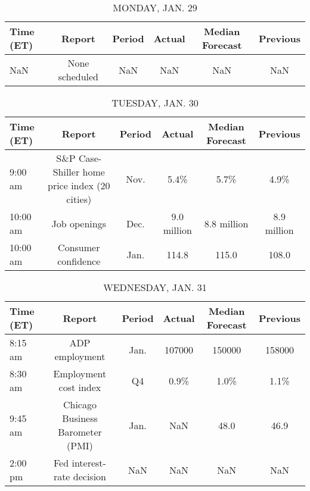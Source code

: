 \documentclass{article}%
\begin{document}
%
\normalsize%


\begin{table}[htbp]%
\caption{MONDAY, JAN. 29}%
\centering%
\begin{adjustbox}{width=1\textwidth}%
\begin{tabular}{lccccc}
\toprule
Time (ET) &         Report & Period & Actual & Median Forecast & Previous \\
\midrule
      NaN & None scheduled &    NaN &    NaN &             NaN &      NaN \\
\bottomrule
\end{tabular}
%
\end{adjustbox}%
\end{table}

%


\begin{table}[htbp]%
\caption{TUESDAY, JAN. 30}%
\centering%
\begin{adjustbox}{width=1\textwidth}%
\begin{tabular}{lccccc}
\toprule
Time (ET) &                                        Report & Period &      Actual & Median Forecast &    Previous \\
\midrule
  9:00 am & S\&P Case-Shiller home price index (20 cities) &   Nov. &        5.4\% &            5.7\% &        4.9\% \\
 10:00 am &                                  Job openings &   Dec. & 9.0 million &     8.8 million & 8.9 million \\
 10:00 am &                           Consumer confidence &   Jan. &       114.8 &           115.0 &       108.0 \\
\bottomrule
\end{tabular}
%
\end{adjustbox}%
\end{table}

%


\begin{table}[htbp]%
\caption{WEDNESDAY, JAN. 31}%
\centering%
\begin{adjustbox}{width=1\textwidth}%
\begin{tabular}{lccccc}
\toprule
Time (ET) &                           Report & Period & Actual & Median Forecast & Previous \\
\midrule
  8:15 am &                   ADP employment &   Jan. & 107000 &          150000 &   158000 \\
  8:30 am &            Employment cost index &     Q4 &   0.9\% &            1.0\% &     1.1\% \\
  9:45 am & Chicago Business Barometer (PMI) &   Jan. &    NaN &            48.0 &     46.9 \\
  2:00 pm &       Fed interest-rate decision &    NaN &    NaN &             NaN &      NaN \\
\bottomrule
\end{tabular}
%
\end{adjustbox}%
\end{table}
\end{document}
